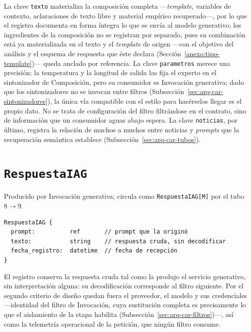 \documentclass[12pt]{report}
\begin{document}
La clave \texttt{texto} materializa la composición completa ---\textit{template}, variables de contexto, aclaraciones de texto libre y material empírico recuperado---, por lo que el registro documenta en forma íntegra lo que se envía al modelo generativo; los ingredientes de la composición no se registran por separado, pues su combinación está ya materializada en el texto y el \textit{template} de origen ---con el objetivo del análisis y el esquema de respuesta que éste declara (Sección~\ref{anexo:tipo-template})--- queda anclado por referencia. La clave \texttt{parametros} merece una precisión: la temperatura y la longitud de salida las fija el experto en el sintonizador de Composición, pero su consumidor es Invocación generativa; dado que los sintonizadores no se invocan entre filtros (Subsección~\ref{sec:arq-car-sintonizadores}), la única vía compatible con el estilo para hacérselos llegar es el propio dato. No se trata de configuración del filtro filtrándose en el contrato, sino de información que un consumidor aguas abajo espera. La clave \texttt{noticias}, por último, registra la relación de muchos a muchos entre noticias y \textit{prompts} que la recuperación semántica establece (Subsección~\ref{sec:arq-car-tubos}).

\section{\texorpdfstring{\texttt{RespuestaIAG}}{RespuestaIAG}}
\label{anexo:tipo-respuestaiag}

Producido por Invocación generativa; circula como \texttt{RespuestaIAG[M]} por el tubo 8\(\to\)9.

\noindent\begin{minipage}{\linewidth}
  \begin{lstlisting}[style=tipoanexo]
RespuestaIAG {
  prompt:          ref       // prompt que la originó
  texto:           string    // respuesta cruda, sin decodificar
  fecha_registro:  datetime  // fecha de recepción
}
\end{lstlisting}
\end{minipage}

El registro conserva la respuesta cruda tal como la produjo el servicio generativo, sin interpretación alguna: su decodificación corresponde al filtro siguiente. Por el segundo criterio de diseño quedan fuera el proveedor, el modelo y sus credenciales ---identidad del filtro de Invocación, cuya sustitución completa es precisamente lo que el aislamiento de la etapa habilita (Subsección~\ref{sec:arq-car-filtros})---, así como la telemetría operacional de la petición, que ningún filtro consume.
\end{document}
